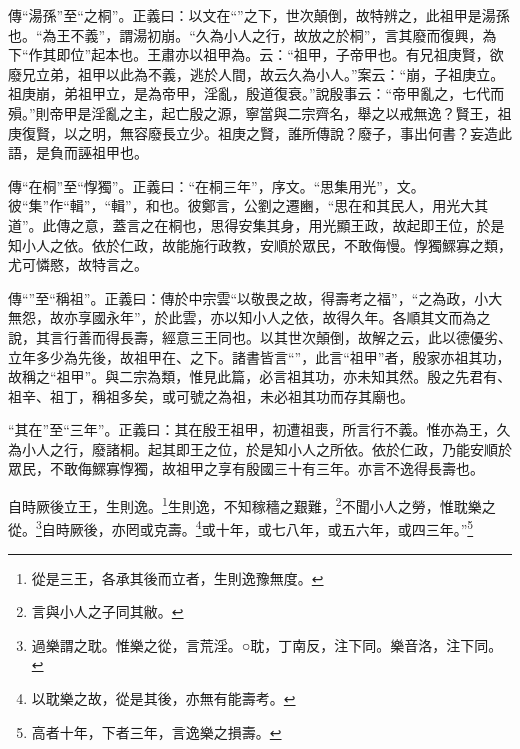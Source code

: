 {\noindent\zhuan{}\fzbyks 傳“湯孫”至“之桐”。正義曰：以文在“”之下，世次顛倒，故特辨之，此祖甲是湯孫也。“為王不義”，謂湯初崩。“久為小人之行，故放之於桐”，言其廢而復興，為下“作其即位”起本也。王肅亦以祖甲為。云：“祖甲，子帝甲也。有兄祖庚賢，欲廢兄立弟，祖甲以此為不義，逃於人間，故云久為小人。”案云：“崩，子祖庚立。祖庚崩，弟祖甲立，是為帝甲，淫亂，殷道復衰。”說殷事云：“帝甲亂之，七代而殞。”則帝甲是淫亂之主，起亡殷之源，寧當與二宗齊名，舉之以戒無逸？賢王，祖庚復賢，以之明，無容廢長立少。祖庚之賢，誰所傳說？廢子，事出何書？妄造此語，是負而誣祖甲也。 \par}

{\noindent\zhuan{}\fzbyks 傳“在桐”至“惸獨”。正義曰：“在桐三年”，序文。“思集用光”，文。彼“集”作“輯”，“輯”，和也。彼鄭言，公劉之遷豳，“思在和其民人，用光大其道”。此傳之意，蓋言之在桐也，思得安集其身，用光顯王政，故起即王位，於是知小人之依。依於仁政，故能施行政教，安順於眾民，不敢侮慢。惸獨鰥寡之類，尤可憐愍，故特言之。 \par}

{\noindent\zhuan{}\fzbyks 傳“”至“稱祖”。正義曰：傳於中宗雲“以敬畏之故，得壽考之福”，“之為政，小大無怨，故亦享國永年”，於此雲，亦以知小人之依，故得久年。各順其文而為之說，其言行善而得長壽，經意三王同也。以其世次顛倒，故解之云，此以德優劣、立年多少為先後，故祖甲在、之下。諸書皆言“”，此言“祖甲”者，殷家亦祖其功，故稱之“祖甲”。與二宗為類，惟見此篇，必言祖其功，亦未知其然。殷之先君有、祖辛、祖丁，稱祖多矣，或可號之為祖，未必祖其功而存其廟也。 \par}

{\noindent\shu{}\fzkt “其在”至“三年”。正義曰：其在殷王祖甲，初遭祖喪，所言行不義。惟亦為王，久為小人之行，廢諸桐。起其即王之位，於是知小人之所依。依於仁政，乃能安順於眾民，不敢侮鰥寡惸獨，故祖甲之享有殷國三十有三年。亦言不逸得長壽也。 \par}

自時厥後立王，生則逸。\footnote{從是三王，各承其後而立者，生則逸豫無度。}生則逸，不知稼穡之艱難，\footnote{言與小人之子同其敝。}不聞小人之勞，惟耽樂之從。\footnote{過樂謂之耽。惟樂之從，言荒淫。○耽，丁南反，注下同。樂音洛，注下同。}自時厥後，亦罔或克壽。\footnote{以耽樂之故，從是其後，亦無有能壽考。}或十年，或七八年，或五六年，或四三年。”\footnote{高者十年，下者三年，言逸樂之損壽。}

